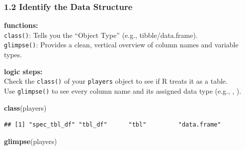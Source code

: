 \documentclass[
]{article}
\newenvironment{Shaded}{\begin{snugshade}}{\end{snugshade}}
\newcommand{\FunctionTok}[1]{\textcolor[rgb]{0.13,0.29,0.53}{\textbf{#1}}}
\newcommand{\NormalTok}[1]{#1}
\begin{document}
\subsubsection{1.2 Identify the Data
Structure}\label{identify-the-data-structure}

\textbf{functions:}\\
\texttt{class()}: Tells you the ``Object Type'' (e.g.,
tibble/data.frame).\\
\texttt{glimpse()}: Provides a clean, vertical overview of column names
and variable types.

\textbf{logic steps:}\\
Check the \texttt{class()} of your \texttt{players} object to see if R
treats it as a table.\\
Use \texttt{glimpse()} to see every column name and its assigned data
type (e.g., , ).

\begin{Shaded}
\begin{Highlighting}[]
\FunctionTok{class}\NormalTok{(players) }
\end{Highlighting}
\end{Shaded}

\begin{verbatim}
## [1] "spec_tbl_df" "tbl_df"      "tbl"         "data.frame"
\end{verbatim}

\begin{Shaded}
\begin{Highlighting}[]
\FunctionTok{glimpse}\NormalTok{(players)}
\end{Highlighting}
\end{Shaded}
\end{document}
